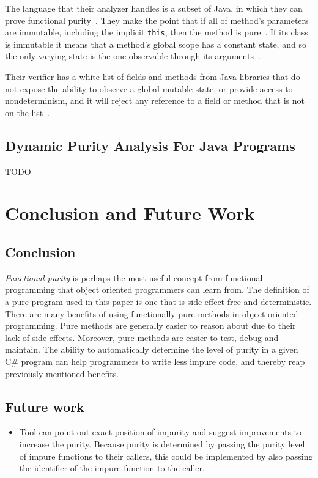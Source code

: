 \documentclass[a4paper,12pt]{article}
\begin{document}
The language that their analyzer handles is a subset of Java, in which they can prove functional purity~\cite{purity-in-java}. They make the point that if all of method's parameters are immutable, including the implicit \texttt{this}, then the method is pure~\cite{purity-in-java}. %
If its class is immutable it means that a method's global scope has a constant state, and so the only varying state is the one observable through its arguments~\cite{purity-in-java}.

Their verifier has a white list of fields and methods from Java libraries that do not expose the ability to observe a global mutable state, or provide access to nondeterminism, and it will reject any reference to a field or method that is not on the list~\cite{purity-in-java}.

\subsection{Dynamic Purity Analysis For Java Programs} \label{sub:Dynamic Purity Analysis For Java Programs}
\cite{xu2007dynamic} TODO

\section{Conclusion and Future Work} \label{sec:Conclusion and future Work} %

\subsection{Conclusion} \label{sub:Conclusion}

\textit{Functional purity} is perhaps the most useful concept from functional programming that object oriented programmers can learn from. The definition of a pure program used in this paper is one that is side-effect free and deterministic. There are many benefits of using functionally pure methods in object oriented programming. Pure methods are generally easier to reason about due to their lack of side effects. Moreover, pure methods are easier to test, debug and maintain. The ability to automatically determine the level of purity in a given C\# program can help programmers to write less impure code, and thereby reap previously mentioned benefits.

\subsection{Future work} \label{sub:Future work}

\begin{itemize}
  \item Tool can point out exact position of impurity and suggest improvements to increase the purity. Because purity is determined by passing the purity level of impure functions to their callers, this could be implemented by also passing the identifier of the impure function to the caller.
\end{itemize}



\end{document}
